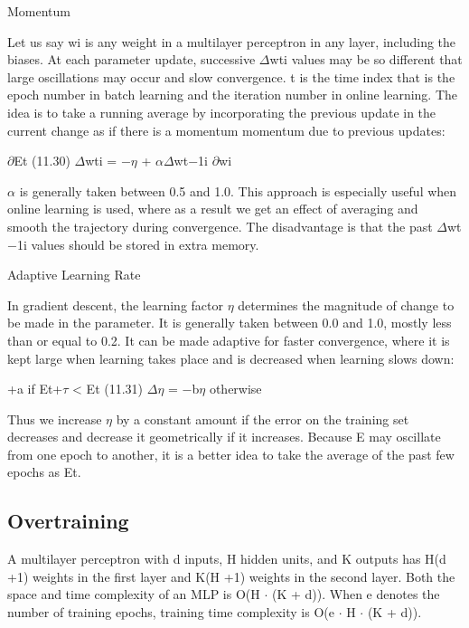 Momentum

Let us say wi is any weight in a multilayer perceptron in any layer, including the biases. At each parameter update, successive $\Delta$wti values may be so different that large oscillations may occur and slow convergence. t is the time index that is the epoch number in batch learning and the iteration number in online learning. The idea is to take a running average by incorporating the previous update in the current change as if there is a momentum momentum due to previous updates:

$\partial$Et (11.30) $\Delta$wti = $-$$\eta$ + $\alpha$$\Delta$wt$-$1i $\partial$wi

$\alpha$ is generally taken between 0.5 and 1.0. This approach is especially useful when online learning is used, where as a result we get an effect of averaging and smooth the trajectory during convergence. The disadvantage is that the past $\Delta$wt$-$1i values should be stored in extra memory.

Adaptive Learning Rate

In gradient descent, the learning factor $\eta$ determines the magnitude of change to be made in the parameter. It is generally taken between 0.0 and 1.0, mostly less than or equal to 0.2. It can be made adaptive for faster convergence, where it is kept large when learning takes place and is decreased when learning slows down:

+a if Et+$\tau$ < Et (11.31) $\Delta$$\eta$ = $-$b$\eta$ otherwise

Thus we increase $\eta$ by a constant amount if the error on the training set decreases and decrease it geometrically if it increases. Because E may oscillate from one epoch to another, it is a better idea to take the average of the past few epochs as Et.

\subsection{Overtraining}

A multilayer perceptron with d inputs, H hidden units, and K outputs has H(d +1) weights in the first layer and K(H +1) weights in the second layer. Both the space and time complexity of an MLP is O(H $\cdot$ (K + d)). When e denotes the number of training epochs, training time complexity is O(e $\cdot$ H $\cdot$ (K + d)).

